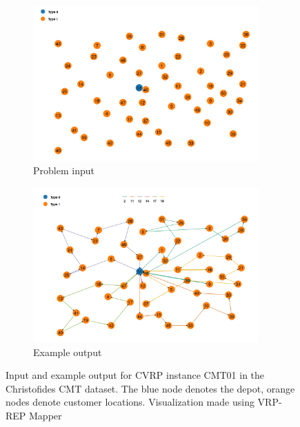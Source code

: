 \documentclass{report}
\begin{document}
\begin{figure}[]
    \centering
    \begin{subfigure}[b]{0.49\linewidth}
        \centering
        \includegraphics[width=0.95\textwidth]{images/cmt01.png}
        \caption{Problem input}
    \end{subfigure}
    \begin{subfigure}[b]{0.49\linewidth}
        \centering
        \includegraphics[width=0.95\textwidth]{images/cmt01_solution.png}
        \caption{Example output}
    \end{subfigure}
    \caption{Input and example output for CVRP instance CMT01 in the Christofides CMT dataset. The blue node denotes the depot, orange nodes denote customer locations. Visualization made using VRP-REP Mapper \protect\footnotemark }
	\label{fig:prob_example}
\end{figure}

\end{document}
